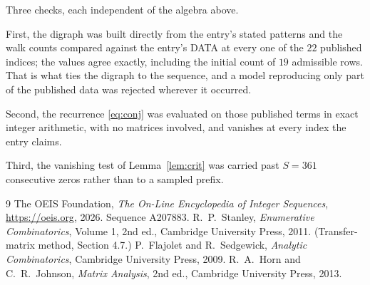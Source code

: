 \documentclass[11pt,a4paper]{article}
\theoremstyle{plain}
\theoremstyle{definition}
\begin{document}
Three checks, each independent of the algebra above.

First, the digraph was built directly from the entry's stated patterns and the walk counts
compared against the entry's DATA at every one of the $22$ published indices; the
values agree exactly, including the initial count of $19$ admissible rows. That is
what ties the digraph to the sequence, and a model reproducing only part of the published
data was rejected wherever it occurred.

Second, the recurrence \eqref{eq:conj} was evaluated on those published terms in exact
integer arithmetic, with no matrices involved, and vanishes at every index the entry claims.

Third, the vanishing test of Lemma~\ref{lem:crit} was carried past $S=361$ consecutive
zeros rather than to a sampled prefix.

\begin{thebibliography}{9}
 The OEIS Foundation, \emph{The On-Line Encyclopedia of Integer
Sequences}, \url{https://oeis.org}, 2026. Sequence A207883.
 R.~P.~Stanley, \emph{Enumerative Combinatorics}, Volume 1, 2nd ed.,
Cambridge University Press, 2011. (Transfer-matrix method, Section 4.7.)
 P.~Flajolet and R.~Sedgewick, \emph{Analytic Combinatorics}, Cambridge
University Press, 2009.
 R.~A.~Horn and C.~R.~Johnson, \emph{Matrix Analysis}, 2nd ed., Cambridge
University Press, 2013.
\end{thebibliography}
\end{document}
